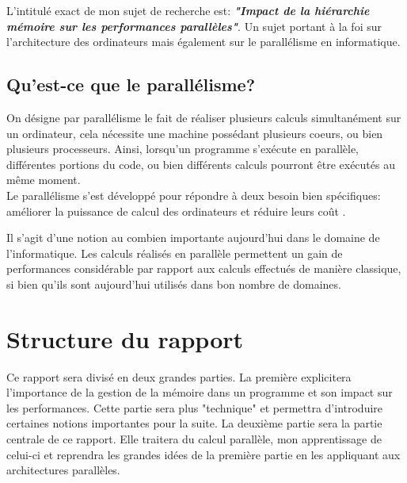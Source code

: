 L'intitulé exact de mon sujet de recherche est: \textbf{\textit{"Impact de la hiérarchie mémoire sur les performances parallèles"}}. Un sujet portant à la foi sur l'architecture des ordinateurs mais également sur le parallélisme en informatique. 

\subsection{Qu'est-ce que le parallélisme?}
On désigne par parallélisme le fait de réaliser plusieurs calculs simultanément sur un ordinateur, cela nécessite une machine possédant plusieurs coeurs, ou bien plusieurs processeurs. Ainsi, lorsqu'un programme s'exécute en parallèle, différentes portions du code, ou bien différents calculs pourront être exécutés au même moment.\\ 

Le parallélisme s'est développé pour répondre à deux besoin bien spécifiques: améliorer la puissance de calcul des ordinateurs et réduire leurs coût \cite{ref2}.

Il s'agit d'une notion au combien importante aujourd'hui dans le domaine de l'informatique. Les calculs réalisés en parallèle permettent un gain de performances considérable par rapport aux calculs effectués de manière classique, si bien qu'ils sont aujourd'hui utilisés dans bon nombre de domaines.

\section{Structure du rapport}

Ce rapport sera divisé en deux grandes parties. La première explicitera l'importance de la gestion de la mémoire dans un programme et son impact sur les performances. Cette partie sera plus "technique" et permettra d'introduire certaines notions importantes pour la suite. La deuxième partie sera la partie centrale de ce rapport. Elle traitera du calcul parallèle, mon apprentissage de celui-ci et reprendra les grandes idées de la première partie en les appliquant aux architectures parallèles. 